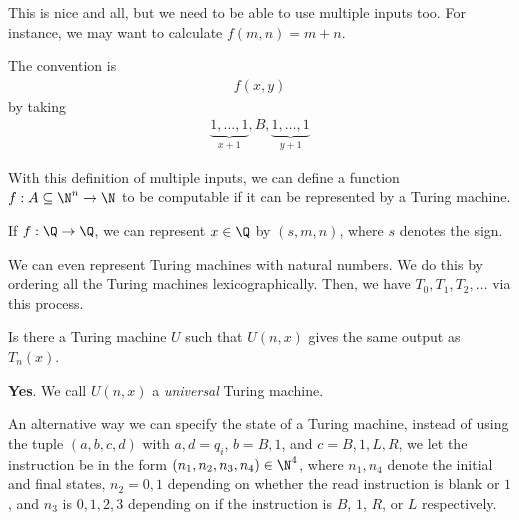 \documentclass[10pt]{mypackage}
\begin{document}
This is nice and all, but we need to be able to use multiple inputs too. For instance, we may want to calculate $f(m,n) = m + n$.
\begin{notation}
  The convention is
  \begin{align*}
    f\left(x , y\right)
  \end{align*}
  by taking
  \begin{align*}
    \underbrace{1,\dots,1}_{x+1},B,\underbrace{1,\dots,1}_{y+1}
  \end{align*}
\end{notation}
With this definition of multiple inputs, we can define a function $f: A\subseteq \N^{n}\rightarrow \N$ to be computable if it can be represented by a Turing machine.\newline

If $f: \Q\rightarrow \Q$, we can represent $x\in \Q$ by $\left(s,m,n\right)$, where $s$ denotes the sign.\newline

We can even represent Turing machines with natural numbers. We do this by ordering all the Turing machines lexicographically. Then, we have $T_{0},T_{1},T_{2},\dots$ via this process.
\begin{question}
  Is there a Turing machine $U$ such that $U\left(n,x\right)$ gives the same output as $T_{n}(x)$.
\end{question}
\begin{answer}
  \textbf{Yes}. We call $U\left(n,x\right)$ a \textit{universal} Turing machine.
\end{answer}
An alternative way we can specify the state of a Turing machine, instead of using the tuple $\left(a,b,c,d\right)$ with $a,d = q_{i}$, $b = B,1$, and $c = B,1,L,R$, we let the instruction be in the form $\left(n_1,n_2,n_3,n_4\right)\in \N^{4}$, where $n_1,n_4$ denote the initial and final states, $n_2 = 0,1$ depending on whether the read instruction is blank or $1$, and $n_3$ is $0,1,2,3$ depending on if the instruction is $B$, $1$, $R$, or $L$ respectively.\newline
\end{document}
